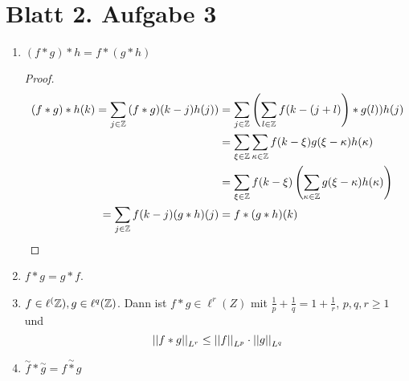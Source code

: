 \documentclass[
 ngerman]{report}
\begin{document}
\section*{Blatt 2. Aufgabe 3}

\begin{enumerate}[1)]
	\item $(f \ast g) \ast h = f \ast (g \ast h)$ 
		\vspace{-1mm}
		\begin{proof}%
			\[\begin{aligned}
				(f \ast g) \ast h (k) = \sum_{j\in\mathbb{Z}} 
					\left(f \ast g)(	k - j ) h(j) \right)
				&	= \sum_{j\in\mathbb{Z}} \left(\sum_{l \in \mathbb{Z}} f(k-(j+l)\right) \ast g(l)) h(j)
			  \\
				& = \sum_{\xi\in\mathbb{Z}} \sum_{\kappa \in \mathbb{Z}} 
					f(k-\xi) g(\xi - \kappa) h(\kappa) 
				\\
				& = \sum_{\xi\in\mathbb{Z}} f(k-\xi) \left(\sum_{\kappa \in \mathbb{Z}} 
					g(\xi - \kappa) h(\kappa) \right)
				\\
				 = \sum_{j\in\mathbb{Z}} f(k-j) (g \ast h) (j) 
				 & = f \ast (g \ast h) (k)
			\end{aligned}\]
		\end{proof}
	\item $f\ast g = g \ast f$. 
	\item $f \in \ell^(\mathbb{Z}), g \in \ell^q(\mathbb{Z})$. Dann ist $f\ast g \in \ell^r (Z)$ 
		mit $ \frac {1} {p} + \frac {1} {q} = 1 + \frac {1} {r}$, $p,q,r \geq 1$
		und 
		$$ \left\lvert \left\lvert f\ast g \right\rvert \right\rvert_{L^r} \leq \left\lvert \left\lvert f \right\rvert \right\rvert_{L^p} \cdot  \left\lvert \left\lvert g \right\rvert \right\rvert_{L^q}$$
	\item $\overset{\sim}{f} \ast \overset{\sim}{g} = \overset{\sim}{f\ast g}$
\end{enumerate}
\end{document}
